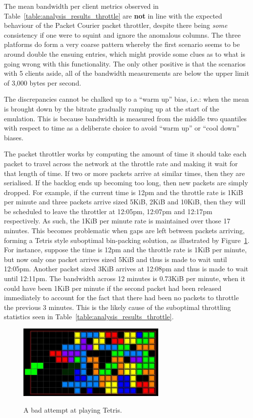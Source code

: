 The mean bandwidth per client metrics observed in Table~\ref{table:analysis_results_throttle} are \textbf{not} in line
with the expected behaviour of the Packet Courier packet throttler, despite there being \emph{some} consistency if
one were to squint and ignore the anomalous columns. The three platforms do form a very coarse pattern whereby the
first scenario seems to be around double the ensuing entries, which might provide some clues as to what is going
wrong with this functionality. The only other positive is that the scenarios with 5 clients aside, all of the bandwidth
measurements are below the upper limit of 3,000 bytes per second.

The discrepancies cannot be chalked up to a ``warm up'' bias, i.e.: when the mean is brought down by the bitrate
gradually ramping up at the start of the emulation. This is because bandwidth is measured from the middle two
quantiles with respect to time as a deliberate choice to avoid ``warm up'' or ``cool down'' biases.

The packet throttler works by computing the amount of time it should take each packet to travel across the network at
the throttle rate and making it wait for that length of time. If two or more packets arrive at similar times, then
they are serialised. If the backlog ends up becoming too long, then new packets are simply dropped. For example, if
the current time is 12pm and the throttle rate is 1KiB per minute and three packets arrive sized 5KiB, 2KiB and
10KiB, then they will be scheduled to leave the throttler at 12:05pm, 12:07pm and 12:17pm respectively. As such, the
1KiB per minute rate is maintained over those 17 minutes. This becomes problematic when gaps are left between packets
arriving, forming a Tetris style suboptimal bin-packing solution, as illustrated by
Figure~\ref{fig:chapter_5_evaluation-tetris_gaps}. For instance, suppose the time is 12pm and the throttle rate is
1KiB per minute, but now only one packet arrives sized 5KiB and thus is made to wait until 12:05pm. Another packet
sized 3KiB arrives at 12:08pm and thus is made to wait until 12:11pm. The bandwidth across 12 minutes is 0.73KiB per
minute, when it could have been 1KiB per minute if the second packet had been released immediately to account for the
fact that there had been no packets to throttle the previous 3 minutes. This is the likely cause of the suboptimal
throttling statistics seen in Table~\ref{table:analysis_results_throttle}.

\begin{figure}[!h]
    \includegraphics[width=0.65\textwidth]{images/chapter_5_evaluation/tetris_gaps}
    \centering~\caption{A bad attempt at playing Tetris\cite{tetris_gaps}.}
    \label{fig:chapter_5_evaluation-tetris_gaps}
\end{figure}

